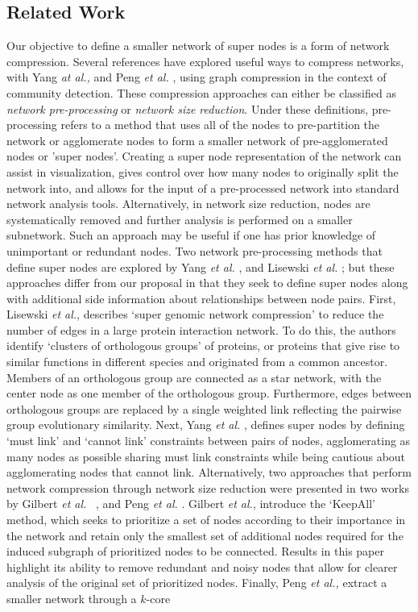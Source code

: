  \subsection{Related Work}
 Our objective to define a smaller network of super nodes is a form of network compression. Several references have explored useful ways to compress networks,\cite{supergenomic,SuperNodeSide,gilbert,peng} with Yang \emph{at al.,} \cite{SuperNodeSide} and Peng \emph{et al.} \cite{peng}, using graph compression in the context of community detection. These compression approaches can either be classified as \emph{network pre-processing} or \emph{network size reduction}. Under these definitions, pre-processing refers to a method that uses all of the nodes to pre-partition the network or agglomerate nodes to form a smaller network of pre-agglomerated nodes or 'super nodes'. Creating a super node representation of the network can assist in visualization, gives control over how many nodes to originally split the network into, and allows for the input of a pre-processed network into standard network analysis tools.  Alternatively, in network size reduction, nodes are systematically removed and further analysis is performed on a smaller subnetwork. Such an approach may be useful if one has prior knowledge of unimportant or redundant nodes. Two network pre-processing methods that define super nodes are explored by Yang \emph{et al.} \cite{SuperNodeSide}, and Lisewski \emph{et al.} \cite{supergenomic}; but these approaches differ from our proposal in that they seek to define super nodes along with additional side information about relationships between node pairs. First, Lisewski \emph{et al.}\cite{supergenomic}, describes `super genomic network compression' to reduce the number of edges in a large protein interaction network. To do this, the authors identify `clusters of orthologous  groups' of proteins, or proteins that give rise to similar functions in different species and originated from a common ancestor. Members of an orthologous group are connected as a star network, with the center node as one member of the orthologous group. Furthermore, edges between orthologous groups are replaced by a single weighted link reflecting the pairwise group evolutionary similarity. Next, Yang \emph{et al.} \cite{SuperNodeSide}, defines super nodes by defining `must link' and `cannot link' constraints between pairs of nodes, agglomerating as many nodes as possible sharing must link constraints while being cautious about agglomerating nodes that cannot link. Alternatively, two approaches that perform network compression through network size reduction were presented in two works by Gilbert \emph{et al.} ~\cite{gilbert}, and Peng \emph{et al.} \cite{peng}. Gilbert \emph{et al.}, introduce the `KeepAll' method, \cite{gilbert} which seeks to prioritize a set of nodes according to their importance in the network and retain only the smallest set of additional nodes required for the induced subgraph of prioritized nodes to be connected. Results in this paper highlight its ability to remove redundant and noisy nodes that allow for clearer analysis of the original set of prioritized nodes. Finally, Peng \emph{et al.,} \cite{peng} extract a smaller network through a $k$-core 